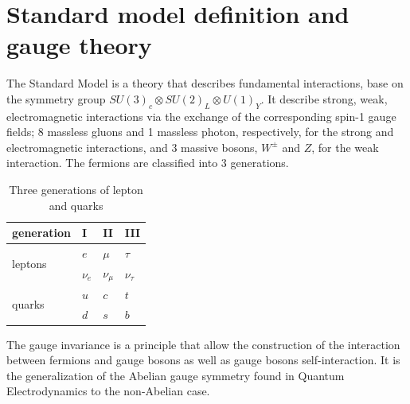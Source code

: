 \documentclass{report}
\numberwithin{equation}{section}
\begin{document}
\section{Standard model definition and gauge theory}
The Standard Model is a theory that describes fundamental interactions, base on the symmetry group $SU(3)_c \otimes SU(2)_L \otimes U(1)_Y$. It describe strong, weak, electromagnetic interactions via the exchange of the corresponding spin-1 gauge fields; 8 massless gluons and 1 massless photon, respectively, for the strong and electromagnetic interactions, and 3 massive bosons, $W^\pm$ and $Z$, for the weak interaction. The fermions are classified into 3 generations.
\begin{table}[h]
\centering
\begin{tabular}{|l|l|l|l|}
\hline
generation               & I       & II        & III        \\ \hline
\multirow{2}{*}{leptons} & $e$     & $\mu$     & $\tau$     \\ \cline{2-4} 
                         & $\nu_e$ & $\nu_\mu$ & $\nu_\tau$ \\ \hline
\multirow{2}{*}{quarks}  & $u$     & $c$       & $t$        \\ \cline{2-4} 
                         & $d$     & $s$       & $b$        \\ \hline
\end{tabular}
\caption{Three generations of lepton and quarks}
\end{table}

The gauge invariance is a principle that allow the construction of the interaction between fermions and gauge bosons as well as gauge bosons self-interaction. It is the generalization of the Abelian gauge symmetry found in Quantum Electrodynamics to the non-Abelian case.
\end{document}
